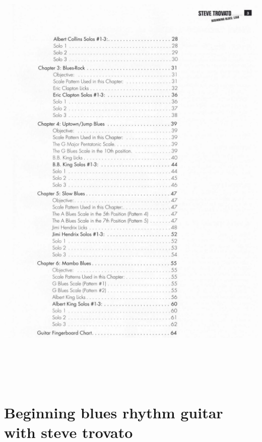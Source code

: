\documentclass[a4paper]{book}
\begin{document}
\begin{center}
\includegraphics[width=16.768cm,height=22.052cm]{lebluessupportsmethodes-img53.png}
\end{center}




\clearpage\section[Beginning blues rhythm guitar with steve
trovato]{Beginning blues rhythm guitar with steve trovato}
\hypertarget{RefHeadingToc118973218262}{}
\end{document}
